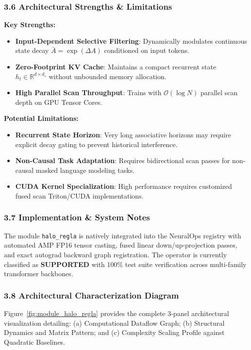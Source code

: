 \subsubsection*{3.6 Architectural Strengths \& Limitations}
\textbf{Key Strengths:}
\begin{itemize}
    \item \textbf{Input-Dependent Selective Filtering}: Dynamically modulates continuous state decay $\bar{A} = \exp(\Delta A)$ conditioned on input tokens.
    \item \textbf{Zero-Footprint KV Cache}: Maintains a compact recurrent state $h_t \in \mathbb{R}^{d \times d_s}$ without unbounded memory allocation.
    \item \textbf{High Parallel Scan Throughput}: Trains with $\mathcal{O}(\log N)$ parallel scan depth on GPU Tensor Cores.
\end{itemize}

\textbf{Potential Limitations:}
\begin{itemize}
    \item \textbf{Recurrent State Horizon}: Very long associative horizons may require explicit decay gating to prevent historical interference.
    \item \textbf{Non-Causal Task Adaptation}: Requires bidirectional scan passes for non-causal masked language modeling tasks.
    \item \textbf{CUDA Kernel Specialization}: High performance requires customized fused scan Triton/CUDA implementations.
\end{itemize}

\subsubsection*{3.7 Implementation \& System Notes}
The module \texttt{halo\_regla} is natively integrated into the NeuralOps registry with automated AMP FP16 tensor casting, fused linear down/up-projection passes, and exact autograd backward graph registration. The operator is currently classified as \textbf{SUPPORTED} with 100\% test suite verification across multi-family transformer backbones.

\subsubsection*{3.8 Architectural Characterization Diagram}
Figure~\ref{fig:module_halo_regla} provides the complete 3-panel architectural visualization detailing: (a) Computational Dataflow Graph; (b) Structural Dynamics and Matrix Pattern; and (c) Complexity Scaling Profile against Quadratic Baselines.

